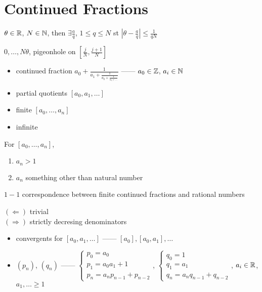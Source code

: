 \section{Continued Fractions}\label{sec:continued-fractions}

\begin{prop}[Dirichlet]
    $\theta \in \mathbb{R}$, $N \in \mathbb{N}$, then $\exists \frac{a}{q}$, $1 \leq q \leq N$ st $|\theta - \frac{a}{q}| \leq \frac{1}{qN}$
\end{prop}
\begin{pf}
    $0, \dots, N\theta$, pigeonhole on $[\frac{j}{N}, \frac{j+1}{N}]$
\end{pf}

\begin{itemize}
    \item continued fraction $a_0 + \frac{1}{a_1 + \frac{1}{a_2 + \frac{1}{a_3 + \dots}}}$ ------ $a_0 \in \mathbb{Z}$, $a_i \in \mathbb{N}$
    \item partial quotients $[a_0, a_1, \dots]$
    \item finite $[a_0, \dots, a_n]$
    \item infinite
\end{itemize}

\begin{convention}
    For $[a_0, \dots, a_n]$, \begin{enumerate}
                                 \item $a_n > 1$
                                 \item $a_n$ something other than natural number
    \end{enumerate}
\end{convention}

\begin{lemma}
    $1-1$ correspondence between finite continued fractions and rational numbers
\end{lemma}
\begin{pf}
    $(\Leftarrow)$ trivial\\
    $(\Rightarrow)$ strictly decresing denominators
\end{pf}

\begin{itemize}
    \item convergents for $[a_0, a_1, \dots]$ ------ $[a_0], [a_0, a_1], \dots$
    \item $(p_n)$, $(q_n)$ ------ $\begin{cases}
                            p_{0} = a_0\\
                            p_1 = a_{0}a_1 + 1\\
                                   p_n = a_n p_{n-1} + p_{n-2}
    \end{cases}$, $\begin{cases}
                      q_0 = 1 \\
                      q_1 = a_1\\
                      q_n = a_n q_{n-1} + q_{n-2}
    \end{cases}$, $a_i \in \mathbb{R}$, $a_1, \dots \geq 1$
\end{itemize}

